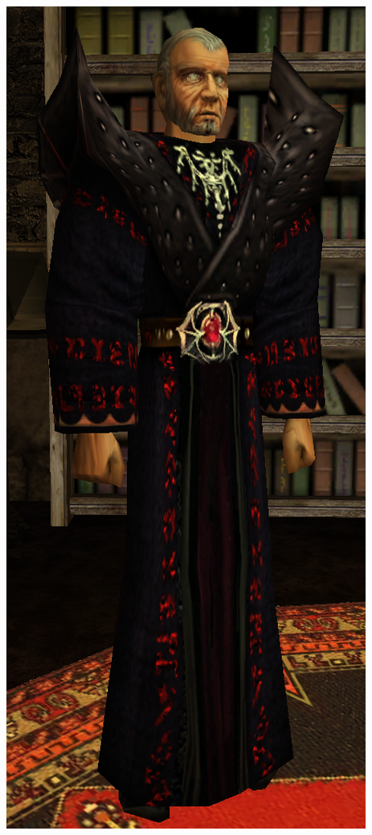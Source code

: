 \documentclass[11pt,polish, openany]{book}
\begin{document}
\begin{center}
\includegraphics[scale=0.5]{xardas}
\end{center}
\end{document}
